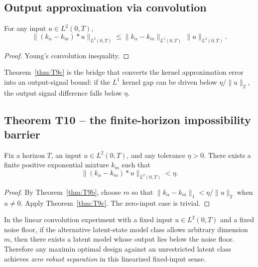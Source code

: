 \subsection{Output approximation via convolution}

\begin{theorem}
\label{thm:T9c}
For any input \(u \in L^2(0,T)\),
\[
\boxed{
\|(k_\alpha - k_m) * u\|_{L^2(0,T)}
\le \|k_\alpha - k_m\|_{L^1(0,T)} \, \|u\|_{L^2(0,T)}.
}
\tag{5}
\]
\end{theorem}

\begin{proof}
Young's convolution inequality.
\end{proof}

Theorem~\ref{thm:T9c} is the bridge that converts the kernel approximation error into an output-signal bound: if the \(L^1\) kernel gap can be driven below \(\eta / \|u\|_2\), the output signal difference falls below \(\eta\).

\subsection{Theorem T10 -- the finite-horizon impossibility barrier}

\begin{theorem}
\label{thm:T10}
Fix a horizon \(T\), an input \(u \in L^2(0,T)\), and any tolerance \(\eta > 0\). There exists a finite positive exponential mixture \(k_m\) such that
\[
\|(k_\alpha - k_m) * u\|_{L^2(0,T)} < \eta.
\]
\end{theorem}

\begin{proof}
By Theorem~\ref{thm:T9b}, choose \(m\) so that \(\|k_\alpha - k_m\|_1 < \eta / \|u\|_2\) when \(u \neq 0\). Apply Theorem~\ref{thm:T9c}. The zero-input case is trivial.
\end{proof}

\begin{corollary}
\label{cor:unrestricted}
In the linear convolution experiment with a fixed input $u \in L^2(0,T)$ and a fixed noise floor, if the alternative latent-state model class allows arbitrary dimension $m$, then there exists a latent model whose output lies below the noise floor. Therefore any maximin optimal design against an unrestricted latent class achieves \emph{zero robust separation} in this linearized fixed-input sense.
\end{corollary}

